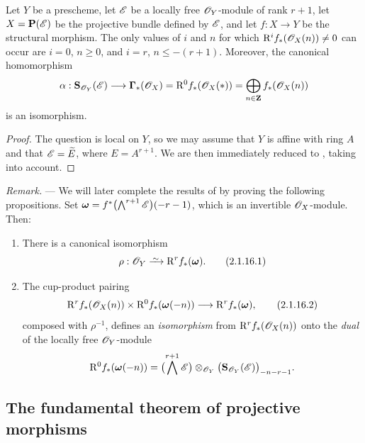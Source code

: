 \begin{proposition}[2.1.15]
\label{III.2.1.15}
Let $Y$ be a prescheme, let $\mathscr{E}$ be a locally free $\mathscr{O}_Y$-module of rank $r+1$, let $X=\mathbf{P}(\mathscr{E})$ be the projective bundle defined by $\mathscr{E}$, and let $f:X\to Y$ be the structural morphism.
The only values of $i$ and $n$ for which $\mathrm{R}^if_*(\mathscr{O}_X(n))\neq0$ can occur are $i=0$, $n\geq0$, and $i=r$, $n\leq-(r+1)$.
Moreover, the canonical homomorphism 
\[
  \alpha:\mathbf{S}_{\mathscr{O}_Y}(\mathscr{E})
  \longrightarrow \boldsymbol{\Gamma}_*(\mathscr{O}_X)
  =\mathrm{R}^0f_*(\mathscr{O}_X(*))
  =\bigoplus_{n\in\mathbf{Z}}f_*(\mathscr{O}_X(n))
\]
is an isomorphism.
\end{proposition}

\begin{proof}
The question is local on $Y$, so we may assume that $Y$ is affine with ring $A$ and that $\mathscr{E}=\widetilde{E}$, where $E=A^{r+1}$.
We are then immediately reduced to , taking  into account.
\end{proof}

\begin{env}[2.1.16]
\label{III.2.1.16}
\emph{Remark.} ---
We will later complete the results of  by proving the following propositions.
Set $\boldsymbol{\omega}=f^*\bigl(\bigwedge^{r+1}\mathscr{E}\bigr)(-r-1)$,
which is an invertible $\mathscr{O}_X$-module.
Then:
\begin{enumerate}
  \item[{\rm(i)}] There is a canonical isomorphism
  \[
  \label{III.2.1.16.1}
    \rho:\sh{O}_Y \simto \RR^rf_*(\boldsymbol{\omega}).
    \tag{2.1.16.1}
  \]
  \item[{\rm(ii)}] The cup-product pairing 
  \[
  \label{III.2.1.16.2}
    \mathrm{R}^rf_*(\mathscr{O}_X(n))
    \times \mathrm{R}^0f_*(\boldsymbol{\omega}(-n))
    \longrightarrow \mathrm{R}^rf_*(\boldsymbol{\omega}),
    \tag{2.1.16.2}
  \]
  composed with $\rho^{-1}$, defines an \emph{isomorphism} from $\mathrm{R}^rf_*(\mathscr{O}_X(n))$ onto the \emph{dual} of the locally free $\mathscr{O}_Y$-module
  \[
    \mathrm{R}^0f_*(\boldsymbol{\omega}(-n))
    =\bigl(\bigwedge^{r+1}\mathscr{E}\bigr)
      \otimes_{\mathscr{O}_Y}
      \bigl(\mathbf{S}_{\mathscr{O}_Y}(\mathscr{E})\bigr)_{-n-r-1}.
  \]
\end{enumerate}
\end{env}

\subsection{The fundamental theorem of projective morphisms}
\label{subsection:III.2.2}

